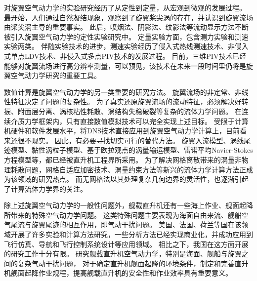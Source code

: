 \documentclass[doctor,openright,twoside,color]{buaathesis}
\begin{document}
对旋翼空气动力学的实验研究经历了从定性到定量，从宏观到微观的发展过程。
最开始，人们通过自然凝结现象，观察到了旋翼桨尖涡的存在，并认识到旋翼流场由桨尖涡主导的重要事实。
此后，喷烟法、阴影法、纹影法等流动显示方法不断被引入旋翼空气动力学的定性实验研究中。
定量实验方面，包含测力实验和测速实验两类。
伴随实验技术的进步，测速实验经历了侵入式热线测速技术、非侵入式单点LDV技术、非侵入式多点PIV技术的发展过程。
目前，三维PIV技术已经能够对旋翼流场进行高分辨率测量，可以预见，该技术在未来一段时间里仍将是旋翼空气动力学研究的重要工具。

数值计算是旋翼空气动力学的另一类重要的研究方法。
旋翼流场的非定常、非线性特征决定了问题的复杂性。
为了真实还原旋翼流场的流动特征，必须解决好转捩、附面层分离、涡核粘性耗散、涡结构失稳破裂等复杂的流体力学问题。
在连续介质力学框架内，只有直接数值模拟技术可以完全实现上述目标。
受限于计算机硬件和软件发展水平，将DNS技术直接应用到旋翼空气动力学计算上，目前看来还很不现实。
因此，有必要寻找切实可行的替代方法。
旋翼入流模型、涡线尾迹模型、黏性涡粒子模型、基于欧拉观点的涡量输运模型、雷诺平均Navier-Stokes方程模型等，都已经被直升机工程界所采用。
为了解决网格离散带来的涡量非物理耗散问题，网格自适应加密技术、涡量约束方法等新兴的流体力学计算方法正成为该领域的研究热点。
而无网格法以其处理复杂几何边界的灵活性，也逐渐引起了计算流体力学界的关注。

除上述旋翼空气动力学的一般性问题外，舰载直升机还有一些海上作业、舰面起降所带来的特殊空气动力学问题。
这类特殊问题主要表现为海面自由来流、舰船空气尾流与旋翼尾迹的相互作用，即气动干扰问题。
美国、法国、荷兰等国在该领域开展了许多实验和计算方法研究，一些分析方法已经实现商业化，并成功应用到飞行仿真、导航和飞行控制系统设计等应用领域。
相比之下，我国在这方面开展的研究工作十分有限。
研究舰载直升机空气动力学，特别是海面、舰船与旋翼之间的复杂气动干扰问题，
对于确定直升机舰面起降的环境条件，制定和完善直升机舰面起降作业规程，提高舰载直升机的安全性和作业效率具有重要意义。

\cleardoublepage
{}
{}

\cleardoublepage
\end{document}
